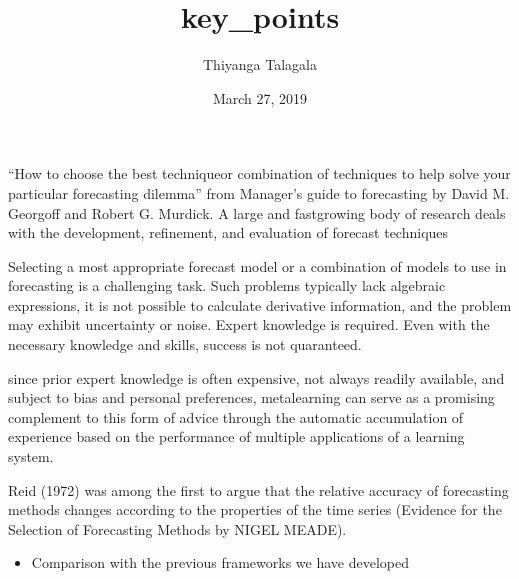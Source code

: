 \documentclass[]{article}
\title{key\_points}
\author{Thiyanga Talagala}
\date{March 27, 2019}
\providecommand{\tightlist}{%
  \setlength{\itemsep}{0pt}\setlength{\parskip}{0pt}}
\begin{document}
\maketitle

``How to choose the best techniqueor combination of techniques to help
solve your particular forecasting dilemma'' from Manager's guide to
forecasting by David M. Georgoff and Robert G. Murdick. A large and
fastgrowing body of research deals with the development, refinement, and
evaluation of forecast techniques

Selecting a most appropriate forecast model or a combination of models
to use in forecasting is a challenging task. Such problems typically
lack algebraic expressions, it is not possible to calculate derivative
information, and the problem may exhibit uncertainty or noise. Expert
knowledge is required. Even with the necessary knowledge and skills,
success is not quaranteed.

since prior expert knowledge is often expensive, not always readily
available, and subject to bias and personal preferences, metalearning
can serve as a promising complement to this form of advice through the
automatic accumulation of experience based on the performance of
multiple applications of a learning system.

Reid (1972) was among the first to argue that the relative accuracy of
forecasting methods changes according to the properties of the time
series (Evidence for the Selection of Forecasting Methods by NIGEL
MEADE).

\begin{itemize}
\tightlist
\item
  Comparison with the previous frameworks we have developed
\end{itemize}
\end{document}
